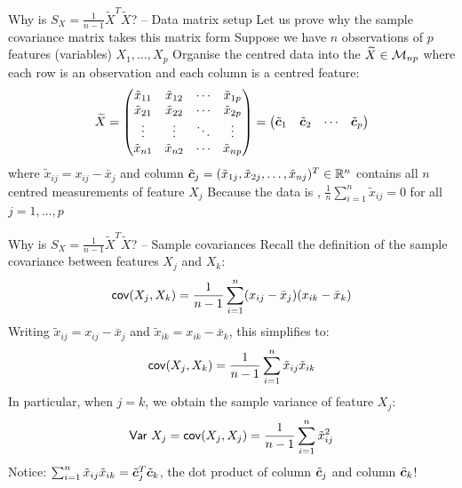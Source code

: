 \documentclass[aspectratio=169]{beamer}\usepackage[]{graphicx}\usepackage[]{xcolor}
\begin{document}
\begin{frame}{Why is $S_X = \frac{1}{n-1}\widetilde{X}^T\widetilde{X}$? -- Data matrix setup}
Let us prove why the sample covariance matrix takes this matrix form
\vfill
Suppose we have $n$ observations of $p$ features (variables) $X_1,\ldots,X_p$
\vfill
Organise the centred data into the  $\widetilde{X}\in\mathcal{M}_{np}$ where each row is an observation and each column is a centred feature:
\[
\widetilde{X} = \begin{pmatrix}
\tilde{x}_{11} & \tilde{x}_{12} & \cdots & \tilde{x}_{1p} \\
\tilde{x}_{21} & \tilde{x}_{22} & \cdots & \tilde{x}_{2p} \\
\vdots & \vdots & \ddots & \vdots \\
\tilde{x}_{n1} & \tilde{x}_{n2} & \cdots & \tilde{x}_{np}
\end{pmatrix}
= \begin{pmatrix} \tilde{\bm{c}}_1 & \tilde{\bm{c}}_2 & \cdots & \tilde{\bm{c}}_p \end{pmatrix}
\]
where $\tilde{x}_{ij} = x_{ij} - \bar{x}_j$ and column $\tilde{\bm{c}}_j = (\tilde{x}_{1j}, \tilde{x}_{2j}, \ldots, \tilde{x}_{nj})^T \in \mathbb{R}^n$ contains all $n$ centred measurements of feature $X_j$
\vfill
Because the data is , $\frac{1}{n}\sum_{i=1}^n \tilde{x}_{ij} = 0$ for all $j=1,\ldots,p$
\end{frame}

\begin{frame}{Why is $S_X = \frac{1}{n-1}\widetilde{X}^T\widetilde{X}$? -- Sample covariances}
Recall the definition of the sample covariance between features $X_j$ and $X_k$:
\[
\mathsf{cov}(X_j, X_k) = \frac{1}{n-1} \sum_{i=1}^n (x_{ij} - \bar x_j)(x_{ik} - \bar x_k)
\]
\vfill
Writing $\tilde{x}_{ij} = x_{ij} - \bar x_j$ and $\tilde{x}_{ik} = x_{ik} - \bar x_k$, this simplifies to:
\[
\mathsf{cov}(X_j, X_k) = \frac{1}{n-1} \sum_{i=1}^n \tilde{x}_{ij} \tilde{x}_{ik}
\]
\vfill
In particular, when $j = k$, we obtain the sample variance of feature $X_j$:
\[
\mathsf{Var}\  X_j = \mathsf{cov}(X_j, X_j) = \frac{1}{n-1} \sum_{i=1}^n \tilde{x}_{ij}^2
\]
\vfill
Notice: $\sum_{i=1}^n \tilde{x}_{ij} \tilde{x}_{ik} = \tilde{\bm{c}}_j^T \tilde{\bm{c}}_k$, the dot product of column $\tilde{\bm{c}}_j$ and column $\tilde{\bm{c}}_k$!
\end{frame}
\end{document}
